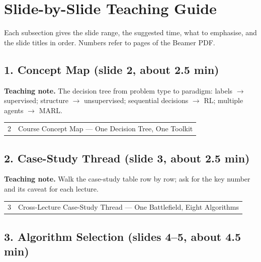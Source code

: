 \documentclass[11pt]{article}
\begin{document}
\section{Slide-by-Slide Teaching Guide}

Each subsection gives the slide range, the suggested time, what to emphasise, and the slide titles in order. Numbers refer to pages of the Beamer PDF.

\subsection{1. Concept Map \normalfont\small\color{GreyN}(slide 2, about 2.5 min)}

\textbf{Teaching note.} The decision tree from problem type to paradigm: labels $\to$ supervised; structure $\to$ unsupervised; sequential decisions $\to$ RL; multiple agents $\to$ MARL.

\begin{center}\small\renewcommand{\arraystretch}{1.1}\begin{tabularx}{\textwidth}{@{}r X@{}}2 & Course Concept Map --- One Decision Tree, One Toolkit\\\end{tabularx}\end{center}

\subsection{2. Case-Study Thread \normalfont\small\color{GreyN}(slide 3, about 2.5 min)}

\textbf{Teaching note.} Walk the case-study table row by row; ask for the key number and its caveat for each lecture.

\begin{center}\small\renewcommand{\arraystretch}{1.1}\begin{tabularx}{\textwidth}{@{}r X@{}}3 & Cross-Lecture Case-Study Thread --- One Battlefield, Eight Algorithms\\\end{tabularx}\end{center}

\subsection{3. Algorithm Selection \normalfont\small\color{GreyN}(slides 4--5, about 4.5 min)}
\end{document}
